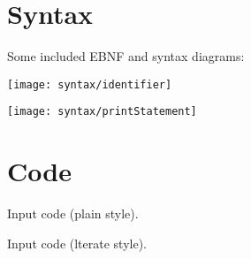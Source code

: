 \documentclass[a4paper]{article}
\begin{document}
\section{Syntax}

Some included EBNF and syntax diagrams:


{\centering

   \texttt{[image: syntax/identifier]}

}


{\centering

   \texttt{[image: syntax/printStatement]}

}

\section{Code}

Input code (plain style).



\noindent Input code (lterate style).
\end{document}
